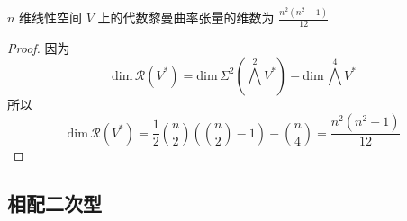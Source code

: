     \begin{proposition}
        $n$ 维线性空间 $V$ 上的代数黎曼曲率张量的维数为 $\displaystyle \frac{n^2(n^2-1)}{12}$
    \end{proposition}
    \begin{proof}
        因为
        \begin{equation*}
            \textstyle \mathrm{dim}\,\mathcal{R}(V^*) = \mathrm{dim}\,\Sigma^2(\bigwedge^2V^*) - \mathrm{dim}\,\bigwedge^4V^*
        \end{equation*}
        所以
        \begin{equation*}
            \mathrm{dim}\,\mathcal{R}(V^*) = \frac{1}{2}\binom{n}{2}\left(\binom{n}{2} - 1\right)-\binom{n}{4} = \frac{n^2(n^2-1)}{12}
        \end{equation*}
    \end{proof}

\subsection{相配二次型}

